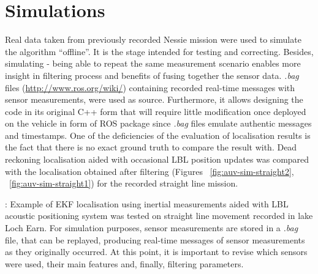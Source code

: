 \section{Simulations} \label{sec:sim}
Real data taken from previously recorded Nessie mission were used to simulate the algorithm ``offline''. It is the stage intended for testing and correcting. Besides, simulating - being able to repeat the same measurement scenario enables more insight in filtering process and benefits of fusing together the sensor data. \textit{.bag} files (\url{http://www.ros.org/wiki/}) containing recorded real-time messages with sensor measurements, were used as source. Furthermore, it allows designing the code in its original C++ form that will require little modification once deployed on the vehicle in form of ROS package since \textit{.bag} files emulate authentic messages and timestamps. One of the deficiencies of the evaluation of localisation results is the fact that there is no exact ground truth to compare the result with. Dead reckoning localisation aided with occasional LBL position updates was compared with the localisation obtained after filtering (Figures ~\ref{fig:auv-sim-straight2}, ~\ref{fig:auv-sim-straight1}) for the recorded straight line mission. 

: Example of EKF localisation using inertial measurements aided with LBL acoustic positioning system was tested on straight line movement recorded in lake Loch Earn. For simulation purposes, sensor measurements are stored in a \textit{.bag} file, that can be replayed, producing real-time messages of sensor measurements as they originally occurred. At this point, it is important to revise which sensors were used, their main features and, finally, filtering parameters. 

